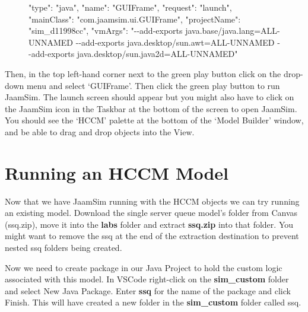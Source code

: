\documentclass[
  10pt,
  a4paperpaper,
  DIV=11,
  numbers=noendperiod,
  oneside]{scrreprt}
\newenvironment{Shaded}{\begin{snugshade}}{\end{snugshade}}
\newcommand{\OperatorTok}[1]{\textcolor[rgb]{0.37,0.37,0.37}{#1}}
\newcommand{\StringTok}[1]{\textcolor[rgb]{0.13,0.47,0.30}{#1}}
\begin{document}
\begin{figure}

\begin{Shaded}
\begin{Highlighting}[numbers=left,,]
\StringTok{"type"}\OperatorTok{:} \StringTok{"java"}\OperatorTok{,}
\StringTok{"name"}\OperatorTok{:} \StringTok{"GUIFrame"}\OperatorTok{,}
\StringTok{"request"}\OperatorTok{:} \StringTok{"launch"}\OperatorTok{,}
\StringTok{"mainClass"}\OperatorTok{:} \StringTok{"com.jaamsim.ui.GUIFrame"}\OperatorTok{,}
\StringTok{"projectName"}\OperatorTok{:} \StringTok{"sim\_d11998cc"}\OperatorTok{,}
\StringTok{"vmArgs"}\OperatorTok{:} \StringTok{"{-}{-}add{-}exports java.base/java.lang=ALL{-}UNNAMED {-}{-}add{-}exports java.desktop/sun.awt=ALL{-}UNNAMED {-}{-}add{-}exports java.desktop/sun.java2d=ALL{-}UNNAMED"}
\end{Highlighting}
\end{Shaded}

\end{figure}%

Then, in the top left-hand corner next to the green play button click on
the drop-down menu and select `GUIFrame'. Then click the green play
button to run JaamSim. The launch screen should appear but you might
also have to click on the JaamSim icon in the Taskbar at the bottom of
the screen to open JaamSim. You should see the `HCCM' palette at the
bottom of the `Model Builder' window, and be able to drag and drop
objects into the View.

\section{Running an HCCM Model}\label{running-an-hccm-model}

Now that we have JaamSim running with the HCCM objects we can try
running an existing model. Download the single server queue model's
folder from Canvas (ssq.zip), move it into the \textbf{labs} folder and
extract \textbf{ssq.zip} into that folder. You might want to remove the
ssq at the end of the extraction destination to prevent nested ssq
folders being created.

Now we need to create package in our Java Project to hold the custom
logic associated with this model. In VSCode right-click on the
\textbf{sim\_custom} folder and select New Java Package. Enter
\textbf{ssq} for the name of the package and click Finish. This will
have created a new folder in the \textbf{sim\_custom} folder called ssq.
\end{document}
